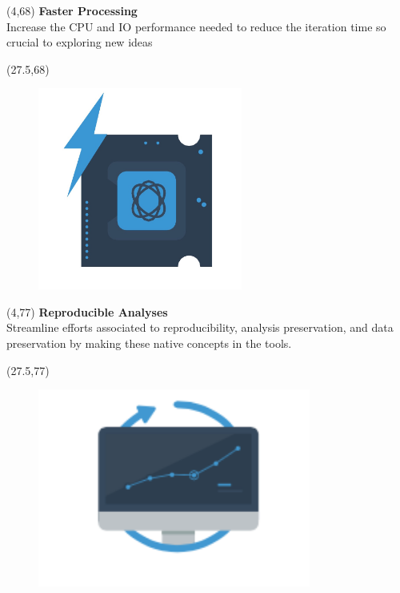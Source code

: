 \documentclass[final]{beamer}
\begin{document}
\begin{frame}{}

\begin{textblock}{22.5}(4,68)
\textcolor{mybluelabel}{\bf Faster Processing} \\
Increase the CPU and IO performance needed to reduce the iteration time so crucial to exploring new ideas
\end{textblock}

\begin{textblock}{12.5}(27.5,68)
\begin{figure}[tbph]
\centering
\includegraphics[width=0.6\textwidth]{faster-processing.jpg}
\end{figure}
\end{textblock}


\begin{textblock}{22.5}(4,77)
\textcolor{mybluelabel}{\bf Reproducible Analyses} \\
Streamline efforts associated to reproducibility, analysis preservation, and data preservation by making these native concepts in the tools.
\end{textblock}

\begin{textblock}{12.5}(27.5,77)
\begin{figure}[tbph]
\centering
\includegraphics[width=0.8\textwidth]{reproducible-ss.png}
\end{figure}
\end{textblock}


\end{frame}
\end{document}
